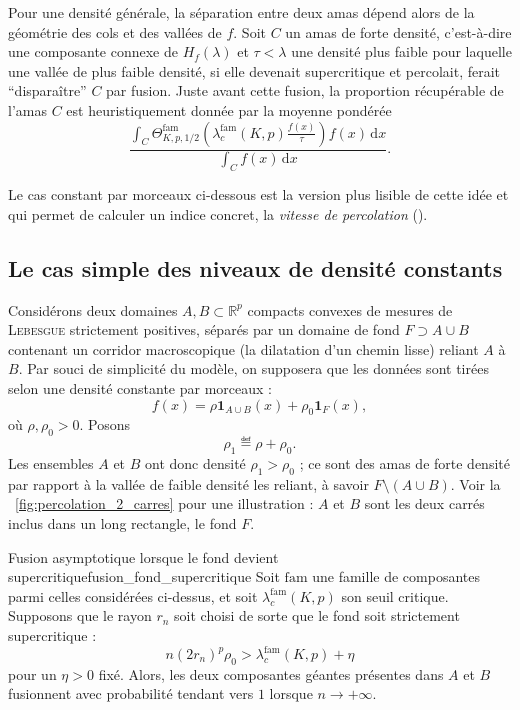 Pour une densité générale, la séparation entre deux amas dépend alors de la géométrie des cols et des vallées de $f$. 
Soit $C$ un amas de forte densité, c'est-à-dire une composante connexe de $H_f(\lambda)$ et $\tau < \lambda$ une densité plus faible pour laquelle une vallée de plus faible densité, si elle devenait supercritique et percolait, ferait ``disparaître'' $C$ par fusion.
Juste avant cette fusion, la proportion récupérable de l'amas $C$ est heuristiquement donnée par la moyenne pondérée
\begin{equation}\label{eq:frac_recouvrement}
    \frac{
        \displaystyle \int_C
        \Theta^{\mathrm{fam}}_{K,p,1/2}
        \left(
            \lambda_c^{\mathrm{fam}}(K,p)\frac{f(x)}{\tau}
        \right)
        f(x)\,\mathrm dx
    }{
        \displaystyle \int_C f(x)\,\mathrm dx
    }.
\end{equation}

Le cas constant par morceaux ci-dessous est la version plus lisible de cette idée et qui permet de calculer un indice concret, la \emph{vitesse de percolation} ().

\subsection{Le cas simple des niveaux de densité constants}

Considérons deux domaines $A,B\subset\mathbb R^p$ compacts convexes de mesures de \textsc{Lebesgue} strictement positives, %
séparés par un domaine de fond $F \supset A \cup B$ contenant un corridor macroscopique (la dilatation d'un chemin lisse) reliant $A$ à $B$. Par souci de simplicité du modèle, on supposera que les données sont tirées selon une densité constante par morceaux :
\[
    f(x)=
    \rho\mathbf 1_{A\cup B}(x)+\rho_0\mathbf 1_F(x),
\]
où $\rho, \rho_0 > 0$. Posons
\[
    \rho_1 \eqdef \rho+\rho_0.
\]
Les ensembles $A$ et $B$ ont donc densité $\rho_1>\rho_0$ ; ce sont des amas de forte densité par rapport à la vallée de faible densité les reliant, à savoir $F \setminus (A\cup B)$. Voir la \Fig~\ref{fig:percolation_2_carres} pour une illustration : $A$ et $B$ sont les deux carrés inclus dans un long rectangle, le fond $F$.

\begin{Fait}{Fusion asymptotique lorsque le fond devient supercritique}{fusion_fond_supercritique}
Soit $\mathrm{fam}$ une famille de composantes parmi celles considérées ci-dessus, et soit $\lambda_c^{\mathrm{fam}}(K,p)$ son seuil critique. Supposons que le rayon $r_n$ soit choisi de sorte que le fond soit strictement supercritique :
\[
    n(2r_n)^p\rho_0
    >
    \lambda_c^{\mathrm{fam}}(K,p)+\eta
\]
pour un $\eta>0$ fixé. Alors, %
les deux composantes géantes présentes dans $A$ et $B$ fusionnent avec probabilité tendant vers $1$ lorsque $n\to+\infty$.
\end{Fait}

